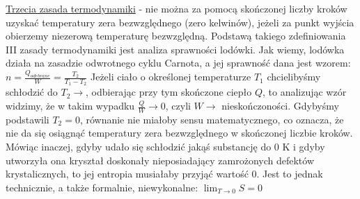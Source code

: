 \underline{Trzecia zasada termodynamiki} - nie można za pomocą skończonej liczby kroków uzyskać temperatury zera bezwzględnego (zero kelwinów), jeżeli za punkt wyjścia obierzemy niezerową temperaturę bezwzględną. Podstawą takiego zdefiniowania III zasady termodynamiki jest analiza sprawności lodówki. Jak wiemy, lodówka działa na zasadzie odwrotnego cyklu Carnota, a jej sprawność dana jest wzorem:\newline
$ n = \frac{Q_{odebrane}}{W} = \frac{T_2}{T_1-T_2} $\newline
Jeżeli ciało o określonej temperaturze $ T_1 $ chcielibyśmy schłodzić do $ T_2 \to $, odbierając przy tym skończone ciepło $ Q $, to analizując wzór widzimy, że w takim wypadku $ \frac{Q}{W} \to 0 $, czyli $ W\to $ nieskończoności. Gdybyśmy podstawili $ T_2 = 0 $, równanie nie miałoby sensu matematycznego, co oznacza, że nie da się osiągnąć temperatury zera bezwzględnego w skończonej liczbie kroków. Mówiąc inaczej, gdyby udało się schłodzić jakąś substancję do 0 K i gdyby utworzyła ona kryształ doskonały nieposiadający zamrożonych defektów krystalicznych, to jej entropia musiałaby przyjąć wartość 0. Jest to jednak technicznie, a także formalnie, niewykonalne:
$ \lim_{T\to0} S = 0 $